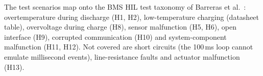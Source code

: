 The test scenarios map onto the BMS HIL test taxonomy of Barreras et al.\ \citep{barreras2016}: overtemperature during discharge (H1, H2), low-temperature charging (datasheet table), overvoltage during charge (H8), sensor malfunction (H5, H6), open interface (H9), corrupted communication (H10) and system-component malfunction (H11, H12). Not covered are short circuits (the 100\,ms loop cannot emulate millisecond events), line-resistance faults and actuator malfunction (H13).
